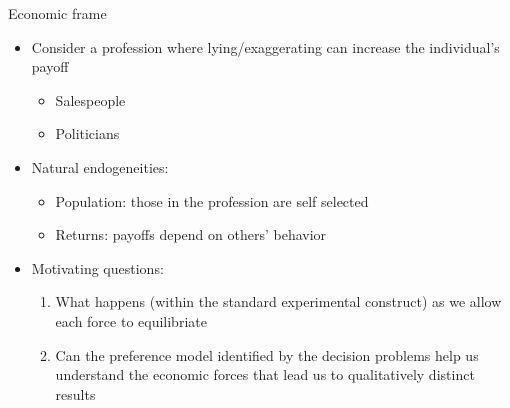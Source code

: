 \documentclass{beamer}
\begin{document}
\begin{frame}{Economic frame}
    \begin{itemize}
        \item Consider a profession where lying/exaggerating can increase the individual's
        payoff
            \begin{itemize}
                \item Salespeople
                \item Politicians
            \end{itemize}
        \item Natural endogeneities:
            \begin{itemize}
                \item Population: those in the profession are self selected
                \item Returns: payoffs depend on others' behavior
            \end{itemize}
    \end{itemize}
\end{frame}

\begin{frame}
    \begin{itemize}
        \item Motivating questions:
            \begin{enumerate}
                \item What happens (within the standard experimental construct) as we allow each force to equilibriate
                \item Can the preference model identified by the decision problems help us understand the economic forces that lead us to qualitatively distinct results
            \end{enumerate}
    \end{itemize}
\end{frame}
\end{document}
